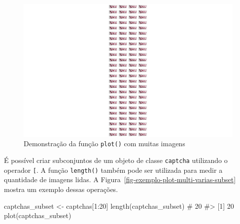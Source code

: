 \documentclass[12pt,twoside,brazilian]{book}
\newenvironment{Shaded}{\begin{snugshade}}{\end{snugshade}}
\newcommand{\CommentTok}[1]{\textcolor[rgb]{0.37,0.37,0.37}{#1}}
\newcommand{\DecValTok}[1]{\textcolor[rgb]{0.68,0.00,0.00}{#1}}
\newcommand{\FunctionTok}[1]{\textcolor[rgb]{0.28,0.35,0.67}{#1}}
\newcommand{\NormalTok}[1]{\textcolor[rgb]{0.00,0.23,0.31}{#1}}
\newcommand{\OtherTok}[1]{\textcolor[rgb]{0.00,0.23,0.31}{#1}}
\newcommand{\SpecialCharTok}[1]{\textcolor[rgb]{0.37,0.37,0.37}{#1}}
\begin{document}
\begin{figure}[H]

{\centering \includegraphics{./resultados_files/figure-pdf/fig-exemplo-plot-multi-varias-1.pdf}

}

\caption{\label{fig-exemplo-plot-multi-varias}Demonstração da função
\texttt{plot()} com muitas imagens}

\end{figure}

É possível criar subconjuntos de um objeto de classe \texttt{captcha}
utilizando o operador \texttt{{[}}. A função \texttt{length()} também
pode ser utilizada para medir a quantidade de imagens lidas. A
Figura~\ref{fig-exemplo-plot-multi-varias-subset} mostra um exemplo
dessas operações.

\begin{Shaded}
\begin{Highlighting}[]
\NormalTok{captchas\_subset }\OtherTok{\textless{}{-}}\NormalTok{ captchas[}\DecValTok{1}\SpecialCharTok{:}\DecValTok{20}\NormalTok{]}
\FunctionTok{length}\NormalTok{(captchas\_subset) }\CommentTok{\# 20}
\CommentTok{\#\textgreater{} [1] 20}
\FunctionTok{plot}\NormalTok{(captchas\_subset)}
\end{Highlighting}
\end{Shaded}
\end{document}
